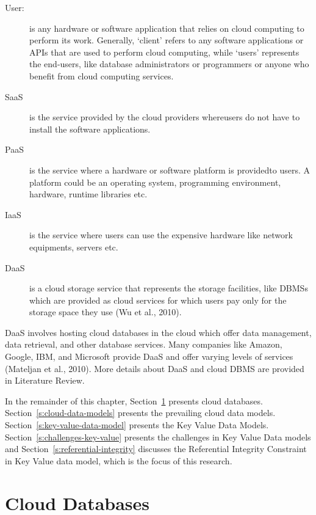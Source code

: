 \begin{description}

\item [User:] is any hardware or software application that relies on cloud
computing to perform its work. Generally, ‘client’ refers to any software applications or
\acp{API}  that are used to perform cloud computing,
while ‘users’ represents the end-users, like  database administrators or
programmers or anyone who benefit from cloud computing services.

\item [\acf{SaaS}] is the service provided by the cloud
providers whereusers do not have to install the software applications.

\item [\acf{PaaS}] is the service where a hardware or
software platform is providedto users. A platform could be an operating system,
programming environment, hardware, runtime libraries etc.

\item [\acf{IaaS}] is the service where users can use
the expensive hardware like network equipments, servers etc.

\item [\acf{DaaS}] is a cloud storage service  that represents
the storage facilities, like  \acp{DBMS} which are provided
as cloud services for which users pay only for the storage space they use (Wu et
al., 2010).

\end{description}


\ac{DaaS} involves hosting cloud databases in the cloud which offer data
management, data retrieval, and other database services. Many companies like
Amazon, Google, IBM, and Microsoft provide \ac{DaaS} and offer varying levels of
services (Mateljan et al., 2010). More details about \ac{DaaS} and cloud
\ac{DBMS} are provided in Literature Review.

In the remainder of this chapter, Section~\ref{s:cloud-databases} presents cloud
databases. Section~\ref{s:cloud-data-models} presents the prevailing cloud data
models. Section~\ref{s:key-value-data-model} presents the Key Value Data Models.
Section~\ref{s:challenges-key-value} presents the challenges in Key Value Data
models and Section~\ref{s:referential-integrity} discusses the Referential
Integrity Constraint in Key Value data model, which is the focus of this research.


\section{Cloud Databases}\label{s:cloud-databases}

